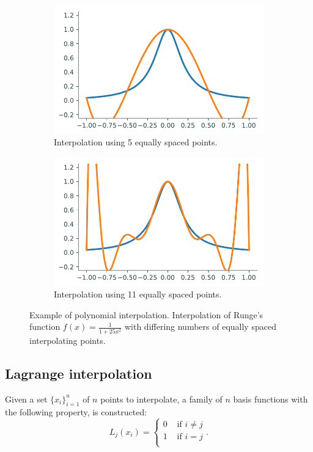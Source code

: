 \begin{figure}
\captionsetup[subfigure]{justification=centering}
\captionsetup{justification=centering}
\centering
\begin{subfigure}{.5\textwidth}
    \centering
    \includegraphics[width=\linewidth]{figures/bad_interp1.pdf}
    \caption{Interpolation using 5 equally spaced points.}
    \label{fig:bad1}
\end{subfigure}%
\begin{subfigure}{.5\textwidth}
    \centering
    \includegraphics[width=\linewidth]{figures/bad_interp2.pdf}
    \caption{Interpolation using 11 equally spaced points.}
    \label{fig:bad2}
\end{subfigure}
\caption{Example of polynomial interpolation. Interpolation of Runge's function $f(x)=\frac{1}{1+25x^2}$ with differing numbers of equally spaced interpolating points.}
\label{fig:badinterp}
\end{figure}

\subsection*{Lagrange interpolation} %
Given a set $\{x_i\}_{i=1}^n$ of $n$ points to interpolate, a family of $n$ basis functions with the following property, is constructed:
\[
L_j(x_i) = \begin{cases} 0 &\mbox{ if } i \neq j\\ 1 &\mbox{ if } i =j \\ \end{cases}.
\]

